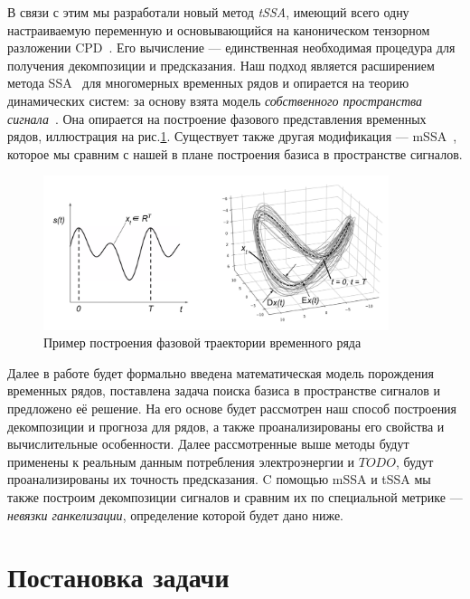 		В связи с этим мы разработали новый метод \emph{tSSA}, имеющий всего одну настраиваемую переменную и основывающийся на каноническом тензорном разложении CPD~\cite{kolda_tensors}. Его вычисление --- единственная необходимая процедура для получения декомпозиции и предсказания. Наш подход является расширением метода SSA~\cite{ecfb9dc578be43ae9ee8fc88b8ff9151} для многомерных временных рядов и опирается на теорию динамических систем: за основу взята модель \textit{собственного пространства сигнала}~\cite{1572261550523548160}. Она опирается на построение фазового представления временных рядов, иллюстрация на рис.\ref{pic:phase_traj}. Существует также другая модификация --- mSSA~\cite{mSSA_overview}, которое мы сравним с нашей в плане построения базиса в пространстве сигналов.
		
		\begin{figure}[h]
			\centering
			\includegraphics[width=0.9\textwidth, keepaspectratio]{../figs/phase_traj.png}
			\caption{Пример построения фазовой траектории временного ряда}\label{pic:phase_traj}
		\end{figure}
		
		Далее в работе будет формально введена математическая модель порождения временных рядов, поставлена задача поиска базиса в пространстве сигналов и предложено её решение. На его основе будет рассмотрен наш способ построения декомпозиции и прогноза для рядов, а также проанализированы его свойства и вычислительные особенности. Далее рассмотренные выше методы будут применены к реальным данным потребления электроэнергии и $ TODO $, будут проанализированы их точность предсказания. C помощью mSSA и tSSA мы также построим декомпозиции сигналов и сравним их по специальной метрике --- \emph{невязки ганкелизации}, определение которой будет дано ниже.
		 
	\section{Постановка задачи}\label{sec:problem_statement}
		 
